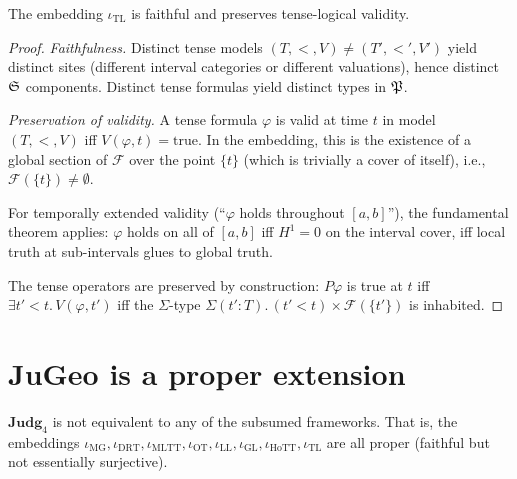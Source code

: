 \begin{theorem}
\label{thm:prior}
The embedding $\iota_{\mathrm{TL}}$ is faithful and preserves
tense-logical validity.
\end{theorem}

\begin{proof}
\emph{Faithfulness.}  Distinct tense models $(T, <, V) \neq
(T', <', V')$ yield distinct sites (different interval categories or
different valuations), hence distinct $\mathfrak{S}$ components.  Distinct
tense formulas yield distinct types in $\mathfrak{P}$.

\emph{Preservation of validity.}  A tense formula $\varphi$ is valid
at time $t$ in model $(T, <, V)$ iff $V(\varphi, t) = \mathrm{true}$.
In the embedding, this is the existence of a global section of
$\mathcal{F}$ over the point $\{t\}$ (which is trivially a cover of
itself), i.e., $\mathcal{F}(\{t\}) \neq \emptyset$.

For temporally extended validity (``$\varphi$ holds throughout
$[a,b]$''), the fundamental theorem applies: $\varphi$ holds on all
of $[a,b]$ iff $H^1 = 0$ on the interval cover, iff local truth at
sub-intervals glues to global truth.

The tense operators are preserved by construction:
$P\varphi$ is true at $t$ iff
$\exists t' < t.\, V(\varphi, t')$ iff the $\Sigma$-type
$\Sigma(t':T).\,(t' < t) \times \mathcal{F}(\{t'\})$ is inhabited.
\end{proof}

\section{JuGeo is a proper extension}
\label{sec:proper}

\begin{theorem}
\label{thm:proper}
$\mathbf{Judg}_4$ is not equivalent to any of the subsumed
frameworks.  That is, the embeddings $\iota_{\mathrm{MG}},
\iota_{\mathrm{DRT}}, \iota_{\mathrm{MLTT}}, \iota_{\mathrm{OT}},
\iota_{\mathrm{LL}}, \iota_{\mathrm{GL}}, \iota_{\mathrm{HoTT}},
\iota_{\mathrm{TL}}$ are all proper (faithful but not essentially
surjective).
\end{theorem}


